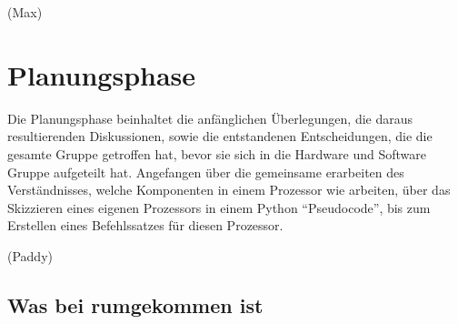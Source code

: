 \documentclass[paper=a4,fontsize=12pt,twocolumn]{scrreprt}
\begin{document}

(Max)

\chapter{Planungsphase}
\label{chap:Planungsphase}

Die Planungsphase beinhaltet die anfänglichen Überlegungen, die daraus resultierenden Diskussionen, sowie die entstandenen Entscheidungen, die die gesamte Gruppe getroffen hat, bevor sie sich in die Hardware und Software Gruppe aufgeteilt hat.
Angefangen über die gemeinsame erarbeiten des Verständnisses, welche Komponenten in einem Prozessor wie arbeiten, über das Skizzieren eines eigenen Prozessors in einem Python \enquote{Pseudocode}, bis zum Erstellen eines Befehlssatzes für diesen Prozessor.







(Paddy)

\section{Was bei rumgekommen ist}
\end{document}
